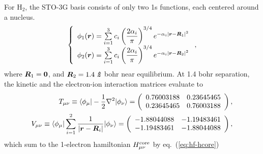 For H$_2$, the STO-3G basis consists of only two 1s functions, each centered around a nucleus.
\begin{align}
\left\{\begin{array}{l}
\phi_1(\boldsymbol{r}) = \sum\limits_{i=1}^3 c_i \left(\dfrac{2\alpha_i}{\pi}\right)^{3/4} e^{-\alpha_i\vert\boldsymbol{r}-\boldsymbol{R}_1\vert^2} \\
\phi_2(\boldsymbol{r}) = \sum\limits_{i=1}^3 c_i \left(\dfrac{2\alpha_i}{\pi}\right)^{3/4} e^{-\alpha_i\vert\boldsymbol{r}-\boldsymbol{R}_2\vert^2}
\end{array}\right.,
\end{align}
where $\boldsymbol{R}_1=\boldsymbol{0}$, and $\boldsymbol{R}_2=1.4~\boldsymbol{\hat{z}}$ bohr near equilibrium. At 1.4 bohr separation, the kinetic and the electron-ion interaction matrices evaluate to
\begin{align}
T_{\mu\nu}\equiv\braket{\phi_\mu|-\frac{1}{2}\nabla^2|\phi_\nu} =
\left(\begin{array}{cc}
0.76003188 & 0.23645465 \\
0.23645465 & 0.76003188
\end{array}\right), \\
V_{\mu\nu}\equiv\braket{\phi_\mu|\sum\limits_{i=1}^{2}\dfrac{1}{\vert\boldsymbol{r}-\boldsymbol{R}_i\vert}|\phi_\nu} = \left(\begin{array}{cc}
-1.88044088 & -1.19483461 \\
-1.19483461 & -1.88044088
\end{array}\right),
\end{align}
which sum to the 1-electron hamiltonian $H^{\text{core}}_{\mu\nu}$ by eq.~(\ref{eq:hf-hcore})

